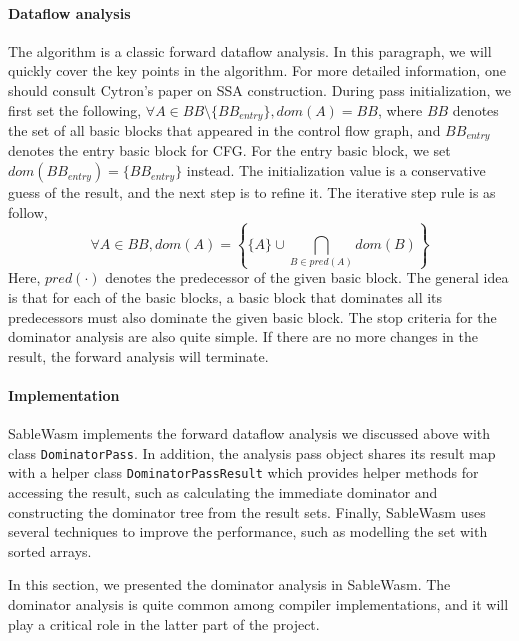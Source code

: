\paragraph{Dataflow analysis}
The algorithm is a classic forward dataflow analysis. In this paragraph, we will
quickly cover the key points in the algorithm. For more detailed information,
one should consult Cytron's paper on SSA construction. During pass
initialization, we first set the following,
$\forall A \in BB \setminus \{ BB_{entry} \}, dom(A) = BB$,
where $BB$ denotes the set of all basic blocks that appeared in the control flow
graph, and $BB_{entry}$ denotes the entry basic block for CFG. For the entry
basic block, we set $dom(BB_{entry}) = \{ BB_{entry} \}$ instead. The
initialization value is a conservative guess of the result, and the next step is
to refine it. The iterative step rule is as follow,
$$
    \forall A \in BB, dom(A) =
    \left\{\{ A \} \cup \bigcap_{B \in pred(A)} dom(B)\right\}
$$
Here, $pred(\cdot)$ denotes the predecessor of the given basic block. The
general idea is that for each of the basic blocks, a basic block that dominates
all its predecessors must also dominate the given basic block. The stop criteria
for the dominator analysis are also quite simple. If there are no more changes
in the result, the forward analysis will terminate.

\paragraph{Implementation}
SableWasm implements the forward dataflow analysis we discussed above with class
\texttt{DominatorPass}. In addition, the analysis pass object shares its result
map with a helper class \texttt{DominatorPassResult} which provides helper
methods for accessing the result, such as calculating the immediate dominator
and constructing the dominator tree from the result sets. Finally, SableWasm
uses several techniques to improve the performance, such as modelling the set
with sorted arrays.

In this section, we presented the dominator analysis in SableWasm. The dominator
analysis is quite common among compiler implementations, and it will play a
critical role in the latter part of the project.